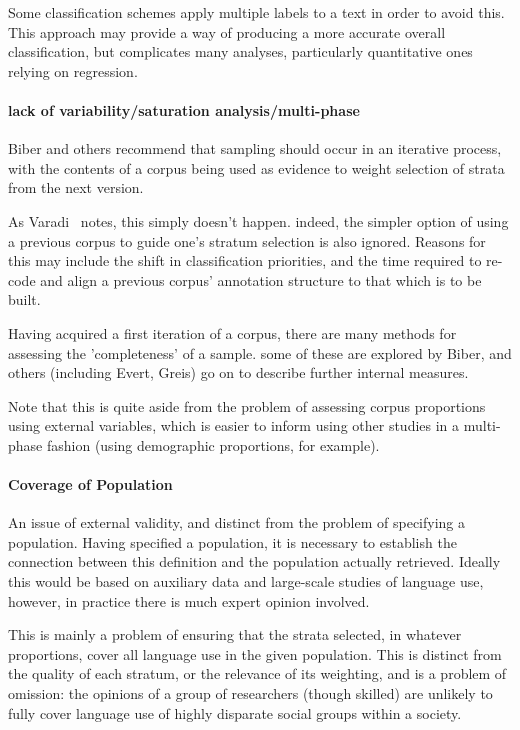 Some classification schemes apply multiple labels to a text in order to avoid this.  This approach may provide a way of producing a more accurate overall classification, but complicates many analyses, particularly quantitative ones relying on regression.


\paragraph{ lack of variability/saturation analysis/multi-phase}
Biber and others\cite{leech2006new,biber1993representativeness} recommend that sampling should occur in an iterative process, with the contents of a corpus being used as evidence to weight selection of strata from the next version.

As Varadi~\cite{varadi2000corpus}\cite{varadi2001linguistic} notes, this simply doesn't happen.  indeed, the simpler option of using a previous corpus to guide one's stratum selection is also ignored.  Reasons for this may include the shift in classification priorities, and the time required to re-code and align a previous corpus' annotation structure to that which is to be built. 

Having acquired a first iteration of a corpus, there are many methods for assessing the 'completeness' of a sample.  some of these are explored by Biber, and others (including Evert, Greis) go on to describe further internal measures\cite{evert2004simple}.

Note that this is quite aside from the problem of assessing corpus proportions using external variables, which is easier to inform using other studies in a multi-phase fashion (using demographic proportions, for example).



\paragraph{Coverage of Population}
An issue of external validity, and distinct from the problem of specifying a population.  Having specified a population, it is necessary to establish the connection between this definition and the population actually retrieved.  Ideally this would be based on auxiliary data and large-scale studies of language use, however, in practice there is much expert opinion involved.

This is mainly a problem of ensuring that the strata selected, in whatever proportions, cover all language use in the given population.  This is distinct from the quality of each stratum, or the relevance of its weighting, and is a problem of omission: the opinions of a group of researchers (though skilled) are unlikely to fully cover language use of highly disparate social groups within a society.

